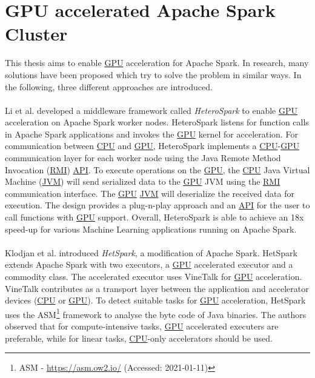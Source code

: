 \section{GPU accelerated Apache Spark Cluster}
This thesis aims to enable \hyperlink{abbr:gpu}{GPU} acceleration for Apache Spark.
In research, many solutions have been proposed which try to solve the problem in similar ways.
In the following, three different approaches are introduced.


\paragraph{}
Li et al. \cite{Li2015HeteroSpark} developed a middleware framework called \textit{HeteroSpark} to enable \hyperlink{abbr:gpu}{GPU} acceleration on Apache Spark worker nodes. HeteroSpark listens for function calls in Apache Spark applications and invokes the \hyperlink{abbr:gpu}{GPU} kernel for acceleration. For communication between \hyperlink{abbr:cpu}{CPU} and \hyperlink{abbr:gpu}{GPU}, HeteroSpark implements a \hyperlink{abbr:cpu}{CPU}-\hyperlink{abbr:gpu}{GPU} communication layer for each worker node using the Java Remote Method Invocation (\hyperlink{abbr:rmi}{RMI}) \hyperlink{abbr:api}{API}. To execute operations on the \hyperlink{abbr:gpu}{GPU}, the \hyperlink{abbr:cpu}{CPU} Java Virtual Machine (\hyperlink{abbr:jvm}{JVM}) will send serialized data to the \hyperlink{abbr:gpu}{GPU} JVM using the \hyperlink{abbr:rmi}{RMI} communication interface. The \hyperlink{abbr:gpu}{GPU} \hyperlink{abbr:jvm}{JVM} will deserialize the received data for execution.
The design provides a plug-n-play approach and an \hyperlink{abbr:api}{API} for the user to call functions with \hyperlink{abbr:gpu}{GPU} support.
Overall, HeteroSpark is able to achieve an 18x speed-up for various Machine Learning applications running on Apache Spark.


\paragraph{}
Klodjan et al. \cite{Klodjan2018HetSpark} introduced \textit{HetSpark}, a modification of Apache Spark.
HetSpark extends Apache Spark with two executors, a \hyperlink{abbr:gpu}{GPU} accelerated executor and a commodity class. 
The accelerated executor uses VineTalk\cite{Mavridis2017VineTalk} for \hyperlink{abbr:gpu}{GPU} acceleration.
VineTalk contributes as a transport layer between the application and accelerator devices (\hyperlink{abbr:cpu}{CPU} or \hyperlink{abbr:gpu}{GPU}).
To detect suitable tasks for \hyperlink{abbr:gpu}{GPU} acceleration, HetSpark uses the ASM\footnote{ASM - \url{https://asm.ow2.io/} (Accessed: 2021-01-11)} framework to analyse the byte code of Java binaries.
The authors observed that for compute-intensive tasks, \hyperlink{abbr:gpu}{GPU} accelerated executers are preferable, while for linear tasks, \hyperlink{abbr:cpu}{CPU}-only accelerators should be used.


